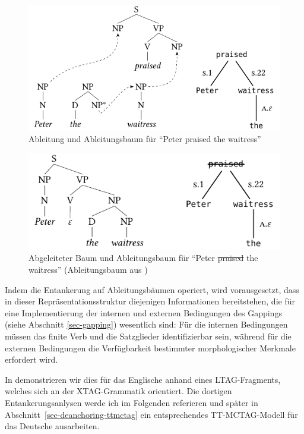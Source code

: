 \begin{figure}[t]
\centering
\includegraphics{graphics/abb814.pdf}
\caption{\label{fig-deanchoring-1}Ableitung und Ableitungsbaum für "`Peter praised the waitress"' \citep[Figure~4]{Lichte:Kallmeyer:10}}
\end{figure}
 

\begin{figure}[t]
\centering
\includegraphics{graphics/abb815.pdf}
\caption{\label{fig-deanchoring-2}Abgeleiteter Baum und Ableitungsbaum für "`Peter \sout{praised} the waitress"' (Ableitungsbaum aus \citealt[Figure~2]{Lichte:Kallmeyer:10})}
\end{figure}

Indem die Entankerung auf Ableitungsbäumen operiert, wird vorausgesetzt, dass in dieser Repräsentationsstruktur diejenigen Informationen bereitstehen, die für eine Implementierung der internen und externen Bedingungen des Gappings (siehe Abschnitt \ref{sec-gapping}) wesentlich sind: Für die internen Bedingungen müssen das finite Verb und die Satzglieder identifizierbar sein, während für die externen Bedingungen die Verfügbarkeit bestimmter morphologischer Merkmale erfordert wird.

In \cite{Lichte:Kallmeyer:10} demonstrieren wir dies für das Englische anhand eines LTAG-Fragments, welches sich an der XTAG-Grammatik \citep{xtag:01} orientiert. Die dortigen Entankerungsanlysen werde ich im Folgenden referieren und später in Abschnitt~\ref{sec-deanchoring-ttmctag} ein entsprechendes TT-MCTAG-Modell für das Deutsche ausarbeiten. 

